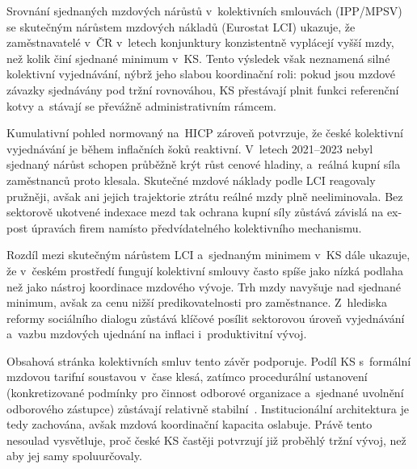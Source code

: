 Srovnání sjednaných mzdových nárůstů v~kolektivních smlouvách (\ac{IPP}/\ac{MPSV}) se skutečným nárůstem mzdových nákladů (Eurostat \ac{LCI}) ukazuje, že zaměstnavatelé v~ČR v~letech konjunktury konzistentně vyplácejí vyšší mzdy, než kolik činí sjednané minimum v~\ac{KS}. Tento výsledek však neznamená silné kolektivní vyjednávání, nýbrž jeho slabou koordinační roli: pokud jsou mzdové závazky sjednávány pod tržní rovnováhou, \ac{KS} přestávají plnit funkci referenční kotvy a~stávají se převážně administrativním rámcem.
\par
Kumulativní pohled normovaný na~\ac{HICP} zároveň potvrzuje, že české kolektivní vyjednávání je během inflačních šoků reaktivní. V~letech 2021--2023 nebyl sjednaný nárůst schopen průběžně krýt růst cenové hladiny, a~reálná kupní síla zaměstnanců proto klesala. Skutečné mzdové náklady podle \ac{LCI} reagovaly pružněji, avšak ani jejich trajektorie ztrátu reálné mzdy plně neeliminovala. Bez sektorově ukotvené indexace mezd tak ochrana kupní síly zůstává závislá na ex-post úpravách firem namísto předvídatelného kolektivního mechanismu.
\par
Rozdíl mezi skutečným nárůstem \ac{LCI} a~sjednaným minimem v~\ac{KS} dále ukazuje, že v~českém prostředí fungují kolektivní smlouvy často spíše jako nízká podlaha než jako nástroj koordinace mzdového vývoje. Trh mzdy navyšuje nad sjednané minimum, avšak za cenu nižší predikovatelnosti pro zaměstnance. Z~hlediska reformy sociálního dialogu zůstává klíčové posílit sektorovou úroveň vyjednávání a~vazbu mzdových ujednání na inflaci i~produktivitní vývoj.
\par
Obsahová stránka kolektivních smluv tento závěr podporuje. Podíl \ac{KS} s~formální mzdovou tarifní soustavou v~čase klesá, zatímco procedurální ustanovení (konkretizované podmínky pro činnost odborové organizace a~sjednané uvolnění odborového zástupce) zůstávají relativně stabilní~\cite{mpsv_ipp}. Institucionální architektura je tedy zachována, avšak mzdová koordinační kapacita oslabuje. Právě tento nesoulad vysvětluje, proč české \ac{KS} častěji potvrzují již proběhlý tržní vývoj, než aby jej samy spoluurčovaly.

